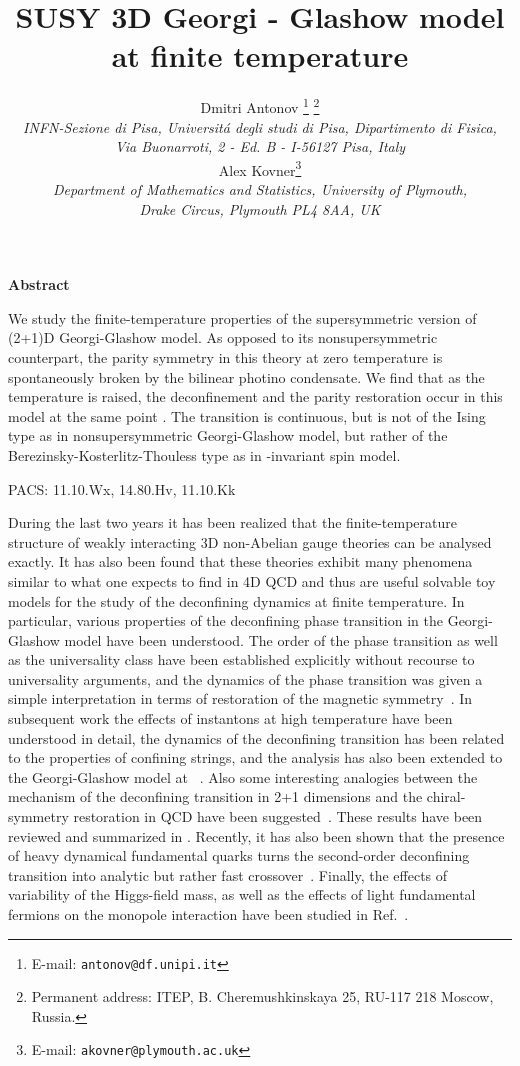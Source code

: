\documentclass[a4paper,12pt]{article}
\title{
\vspace{-3mm} \rightline{\small IFUP-TH 2003/15} \vspace{8mm} \bf
SUSY 3D Georgi - Glashow model at finite temperature}
\author{
Dmitri Antonov \thanks{
E-mail: {\tt antonov@df.unipi.it}}
\thanks{Permanent address:
ITEP, B. Cheremushkinskaya 25, RU-117 218 Moscow, Russia.}\\
{\it INFN-Sezione di Pisa, Universit\'a degli studi di Pisa,
Dipartimento di Fisica,}\\
{\it Via Buonarroti, 2 - Ed. B - I-56127 Pisa, Italy}\\
Alex Kovner\thanks{ E-mail: {\tt akovner@plymouth.ac.uk}} \\{\it
Department of Mathematics and Statistics, University of
Plymouth,}\\{\it Drake Circus, Plymouth PL4 8AA, UK}}
\date{}
\begin{document}
\maketitle \vspace{1mm} \centerline{\bf {Abstract}} \vspace{3mm}
\noindent We study the finite-temperature properties of the
supersymmetric version of (2+1)D Georgi-Glashow model. As
opposed to its nonsupersymmetric counterpart, the parity symmetry
in this theory at zero temperature is spontaneously broken by the
 bilinear photino condensate. We find that as the temperature is
raised, the deconfinement and the parity restoration occur in this
model at the same point \coordHE{}.  The transition is
continuous, but is not of the Ising type as in nonsupersymmetric
Georgi-Glashow model, but rather of the
Berezinsky-Kosterlitz-Thouless type as in \coordHE{}-invariant spin
model.




\vspace{5mm}
\noindent
PACS: 11.10.Wx, 14.80.Hv, 11.10.Kk


\newpage

During the last two years it has been realized that the
finite-temperature structure of weakly interacting 3D non-Abelian gauge
theories can be analysed exactly. It has also been found that these
theories exhibit many phenomena similar to what one expects to
find in 4D QCD and thus are useful solvable toy models for the
study of the deconfining dynamics at finite temperature. In
particular, various properties of the deconfining phase transition
in the \coordHE{} Georgi-Glashow model have been understood. The
order of the phase transition as well as the universality class
have been established explicitly without recourse to universality
arguments, and the dynamics of the phase transition was given a
simple interpretation in terms of restoration of the magnetic symmetry~\cite{2}.
In subsequent work the effects of instantons at high
temperature have been understood in detail, the dynamics of the
deconfining transition has been related to the properties of
confining strings, and the analysis has also been extended to the
\coordHE{} Georgi-Glashow model at \coordHE{}~\cite{gg2}.  Also some
interesting analogies between the mechanism of the deconfining
transition in 2+1 dimensions and the chiral-symmetry restoration
in QCD have been suggested~\cite{gg3}. These results have been
reviewed and summarized in \cite{kk}. Recently, it has also
been shown that the presence of heavy dynamical fundamental quarks
turns the second-order deconfining transition into analytic but
rather fast crossover~\cite{dkn}. Finally, the
effects of variability of the Higgs-field mass, as well as the effects of
light fundamental fermions on the monopole interaction have been studied in Ref.~\cite{antonov}.
\end{document}
